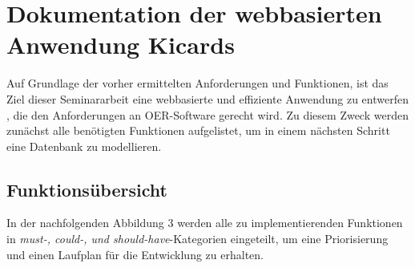 \section{Dokumentation der webbasierten Anwendung Kicards}
Auf Grundlage der vorher ermittelten Anforderungen und Funktionen, ist das Ziel dieser Seminararbeit eine webbasierte und effiziente Anwendung zu entwerfen \cite{kicards}, die den Anforderungen an OER-Software gerecht wird. Zu diesem Zweck werden zunächst alle benötigten Funktionen aufgelistet, um in einem nächsten Schritt eine Datenbank zu modellieren.

\subsection{Funktionsübersicht}
In der nachfolgenden Abbildung 3 werden alle zu implementierenden Funktionen in \emph{must-, could-, und should-have}-Kategorien eingeteilt, um eine Priorisierung und einen Laufplan für die Entwicklung zu erhalten. \\

